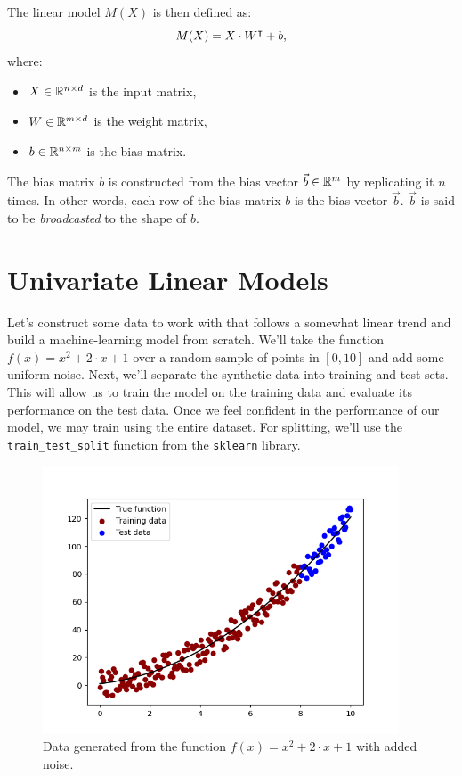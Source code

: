 The linear model $M(X)$ is then defined as:
$$M(X) = X\cdot W^\intercal+b,$$
where:
\begin{itemize}
    \item $X\in \mathbb{R}^{n\times d}$ is the input matrix,
    \item $W\in\mathbb{R}^{m\times d}$ is the weight matrix,
    \item $b \in \mathbb{R}^{n\times m}$ is the bias matrix. 
\end{itemize}

The bias matrix $b$ is constructed from the bias vector $\vec{b}\in\mathbb{R}^{m}$ by replicating it $n$ times. In other words, each row of the bias matrix $b$ is the bias vector $\vec{b}$. $\vec{b}$ is said to be \emph{broadcasted} to the shape of $b$.


\section{Univariate Linear Models}
\label{sec:2}
Let's construct some data to work with that follows a somewhat linear trend and build a machine-learning model from scratch. We'll take the function $f(x)=x^2+2\cdot x+1$ over a random sample of points in $[0,10]$ and add some uniform noise. Next, we'll separate the synthetic data into training and test sets. This will allow us to train the model on the training data and evaluate its performance on the test data. Once we feel confident in the performance of our model, we may train using the entire dataset. For splitting, we'll use the \texttt{train\_test\_split} function from the \texttt{sklearn} library.



\begin{figure}[H]
\centering
\includegraphics[width=300pt]{Regression/code/fig1.png}
\caption{Data generated from the function $f(x)=x^2+2\cdot x+1$ with added noise.}
\label{fig:linear1}
\end{figure}

